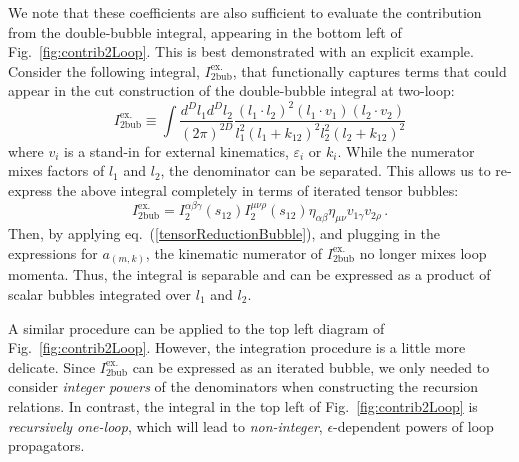 \documentclass[12pt,letter]{article}
\def\Fig#1{fig.~{\ref{#1}}}
\def\Fig#1{Fig.~{\ref{#1}}}
\def\eqn#1{eq.~(\ref{#1})}
\begin{document}
We note that these coefficients are also sufficient to evaluate the contribution from the double-bubble integral, appearing in the bottom left of \Fig{fig:contrib2Loop}. This is best demonstrated with an explicit example. Consider the following integral, $I^{\text{ex}.}_{\text{2bub}}$, that functionally captures terms that could appear in the cut construction of the double-bubble integral at two-loop:
\begin{equation}
I^{\text{ex}.}_{\text{2bub}} \equiv \int \frac{d^D l_{1}d^D l_{2}}{(2\pi)^{2D}} \frac{(l_1\!\cdot\! l_2)^2(l_1\!\cdot\! v_1)(l_2\!\cdot\! v_2)}{l_1^2(l_1+k_{12})^2 l_2^2(l_2+k_{12})^2}
\end{equation}
where $v_i$ is a stand-in for external kinematics, $\varepsilon_i$ or $k_i$. While the numerator mixes factors of $l_1$ and $l_2$, the denominator can be separated. This allows us to re-express the above integral completely in terms of iterated tensor bubbles:
\begin{equation}
I^{\text{ex}.}_{\text{2bub}} = I_{2}^{\alpha\beta\gamma}(s_{12}) I_2^{\mu\nu\rho}(s_{12})\eta_{\alpha\beta}\eta_{\mu\nu}v_{1 \gamma}v_{2 \rho}\,.
\end{equation}
Then, by applying \eqn{tensorReductionBubble}, and plugging in the expressions for $a_{(m,k)}$, the kinematic numerator of $I^{\text{ex}.}_{\text{2bub}}$ no longer mixes loop momenta. Thus, the integral is separable and can be expressed as a product of scalar bubbles integrated over $l_1$ and $l_2$. 

A similar procedure can be applied to the top left diagram of \Fig{fig:contrib2Loop}. However, the integration procedure is a little more delicate. Since $I^{\text{ex}.}_{\text{2bub}}$ can be expressed as an iterated bubble, we only needed to consider \textit{integer powers} of the denominators when constructing the recursion relations. In contrast, the integral in the top left of \Fig{fig:contrib2Loop} is \textit{recursively one-loop}, which will lead to \textit{non-integer}, $\epsilon$-dependent powers of loop propagators. 
\end{document}

